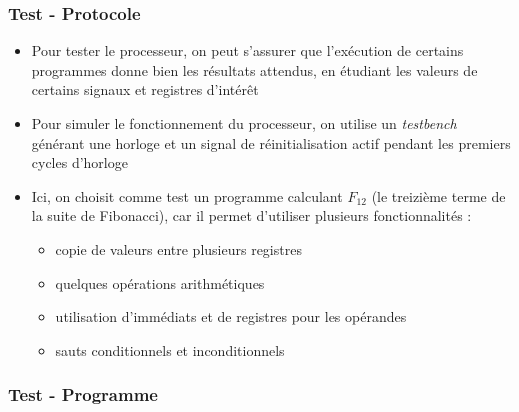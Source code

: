 \documentclass{beamer}
\begin{document}
\begin{frame}
\frametitle{Test - Protocole}
\begin{itemize}
\item Pour tester le processeur, on peut s'assurer que l'exécution de certains
    programmes donne bien les résultats attendus, en étudiant les valeurs de
    certains signaux et registres d'intérêt
\item Pour simuler le fonctionnement du processeur, on utilise un
    \textit{testbench} générant une horloge et un signal de réinitialisation
    actif pendant les premiers cycles d'horloge
\item Ici, on choisit comme test un programme calculant $F_{12}$ (le treizième
    terme de la suite de Fibonacci), car il permet d'utiliser plusieurs
    fonctionnalités :
    \begin{itemize}
    \item copie de valeurs entre plusieurs registres
    \item quelques opérations arithmétiques
    \item utilisation d'immédiats et de registres pour les opérandes
    \item sauts conditionnels et inconditionnels
    \end{itemize}
\end{itemize}
\end{frame}

\begin{frame}
\frametitle{Test - Programme}
\begin{columns}
\begin{column}{.5\textwidth}

\end{column}
\begin{column}{.5\textwidth}

\end{column}
\end{columns}
\end{frame}
\end{document}
